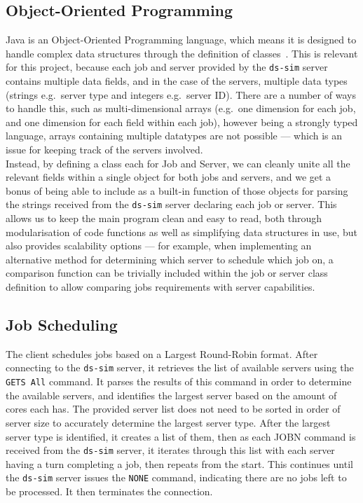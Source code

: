 \documentclass[a4paper]{article} %
\begin{document}
\subsection{Object-Oriented Programming}
Java is an Object-Oriented Programming language, which means it is designed to handle complex data structures through the definition of classes\ \cite{javadoc}. This is relevant for this project, because each job and server 
provided by the \texttt{ds-sim} server contains multiple data fields, and in the case of the servers, multiple data types (strings e.g.\ server type and integers e.g.\ server ID). There are a number of ways to handle this, 
such as multi-dimensional arrays (e.g.\ one dimension for each job, and one dimension for each field within each job), however being a strongly typed language, arrays containing multiple datatypes are not possible --- which 
is an issue for keeping track of the servers involved.\\
Instead, by defining a class each for Job and Server, we can cleanly unite all the relevant fields within a single object for both jobs and servers, and we get a bonus of being able to include as a built-in function of 
those objects for parsing the strings received from the \texttt{ds-sim} server declaring each job or server. This allows us to keep the main program clean and easy to read, both through modularisation of code functions 
as well as simplifying data structures in use, but also provides scalability options --- for example, when implementing an alternative method for determining which server to schedule which job on, a comparison function can 
be trivially included within the job or server class definition to allow comparing jobs requirements with server capabilities.

\subsection{Job Scheduling}
The client schedules jobs based on a Largest Round-Robin format. After connecting to the \texttt{ds-sim} server, it retrieves the list of available servers using the \texttt{GETS All} command. It parses the results of this 
command in order to determine the available servers, and identifies the largest server based on the amount of cores each has. The provided server list does not need to be sorted in order of server size to accurately 
determine the largest server type. After the largest server type is identified, it creates a list of them, then as each JOBN command is received from the \texttt{ds-sim} server, it iterates through this list with each 
server having a turn completing a job, then repeats from the start. This continues until the \texttt{ds-sim} server issues the \texttt{NONE} command, indicating there are no jobs left to be processed. 
It then terminates the connection.
\end{document}

